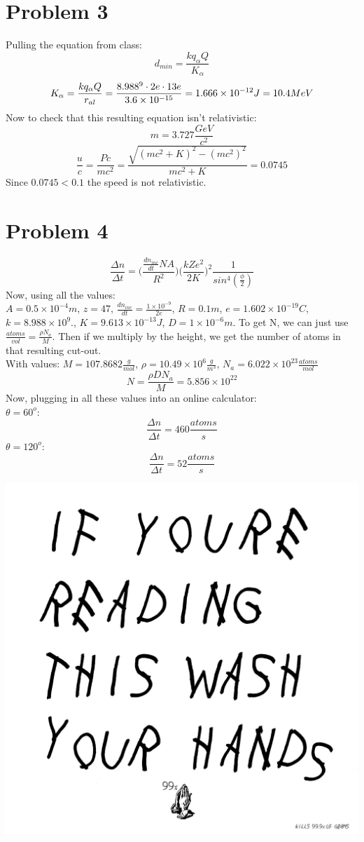 \documentclass[11pt]{article}
\begin{document}
\section*{Problem 3}
    Pulling the equation from class:
    \[d_{min} = \frac{kq_\alpha Q}{K_\alpha}\]
    \[K_\alpha = \frac{kq_\alpha Q}{r_{al}} = \frac{8.988 \time 10^9 \cdot 2e \cdot 13e}{3.6 \times 10^{-15}} = 1.666 \times 10^{-12} J = 10.4 MeV\]
    Now to check that this resulting equation isn't relativistic:\\
    \[m = 3.727 \frac{GeV}{c^2}\]
    \[\frac{u}{c} = \frac{Pc}{mc^2} = \frac{\sqrt{(mc^2 + K)^2 - (mc^2)^2}}{mc^2 + K} = 0.0745\]
    Since $0.0745 < 0.1$ the speed is not relativistic.
    
\section*{Problem 4}    
    \[\frac{\Delta n}{\Delta t} = \Big(\frac{\frac{dn_{inc}}{dt}NA}{R^2}\Big)\Big(\frac{kZe^2}{2K}\Big)^2\frac{1}{sin^4(\frac{\phi}{2})}\]
    Now, using all the values:\\
    $A = 0.5\times 10^{-4} m$, $z=47$, $\frac{dn_{inc}}{dt} = \frac{1\times 10^{-9}}{2e}$, $R = 0.1 m$, $e=1.602 \times 10^{-19} C$, $k = 8.988\times 10^9$., $K = 9.613 \times 10^{-13} J$, $D = 1 \times 10^{-6} m$.
    To get N, we can just use $\frac{atoms}{vol} = \frac{\rho N_a}{M}$. Then if we multiply by the height, we get the number of atoms in that resulting cut-out. \\
    With values: $M = 107.8682\frac{g}{mol}$, $\rho = 10.49 \times 10^6 \frac{g}{m^3}$, $N_a = 6.022 \times 10^{23} \frac{atoms}{mol}$
    \[N = \frac{\rho DN_a}{M} = 5.856 \times 10^{22}\]
    Now, plugging in all these values into an online calculator:\\
    $\theta = 60^o$:
    \[\frac{\Delta n}{\Delta t} = 460 \frac{atoms}{s}\]
    $\theta = 120^o$:
    \[\frac{\Delta n}{\Delta t} = 52 \frac{atoms}{s}\]






    \begin{flushright}\includegraphics[width = \linewidth]{Homework13/photo1.jpg}
    \end{flushright}
    
\end{document}
